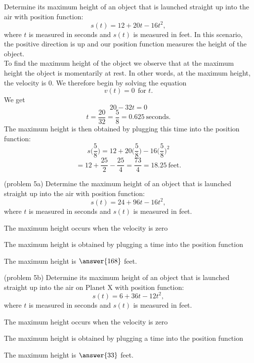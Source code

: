 \documentclass[handout]{ximera}
\begin{document}
\begin{example}[example 5]
Determine its maximum height
of an object that is launched straight up into the air with position function:
\[s(t) = 12 + 20t - 16t^2,\]
where $t$ is measured in seconds and $s(t)$ is measured in feet. 
In this scenario, the positive direction is up and our position function measures the height of the object.\\
To find the maximum height of the object we observe that at the maximum height the object is momentarily at rest. 
In other words, at the maximum height, the velocity is 0. We therefore begin by solving the equation
\[v(t) = 0  \  \ \text{for $t$.}\]
 We get 
\[20-32t = 0\]
\[t = \frac{20}{32} = \frac{5}{8} = 0.625 \ \text{seconds}.\]
The maximum height is then obtained by plugging this time into the position function:
\[s\Big(\frac{5}{8}\Big) = 12 + 20\Big(\frac{5}{8}\Big) - 16\Big(\frac{5}{8}\Big)^2 \]
\[= 12 + \frac{25}{2} - \frac{25}{4} = \frac{73}{4} = 18.25\  \text{feet}. \]
\end{example}


\begin{problem}(problem 5a)
Determine the maximum height
of an object that is launched straight up into the air with position function:
\[s(t) = 24 + 96t - 16t^2,\]
where $t$ is measured in seconds and $s(t)$ is measured in feet. 

\begin{hint}
The maximum height occurs when the velocity is zero
\end{hint}
\begin{hint}
The maximum height is obtained by plugging a time into the position function
\end{hint}

The maximum height is $\answer{168}$ feet.

\end{problem}


\begin{problem}(problem 5b)
Determine its maximum height
of an object that is launched straight up into the air on Planet X with position function:
\[s(t) = 6 + 36t - 12t^2,\]
where $t$ is measured in seconds and $s(t)$ is measured in feet. 

\begin{hint}
The maximum height occurs when the velocity is zero
\end{hint}
\begin{hint}
The maximum height is obtained by plugging a time into the position function
\end{hint}

The maximum height is $\answer{33}$ feet.

\end{problem}
 
\end{document}
